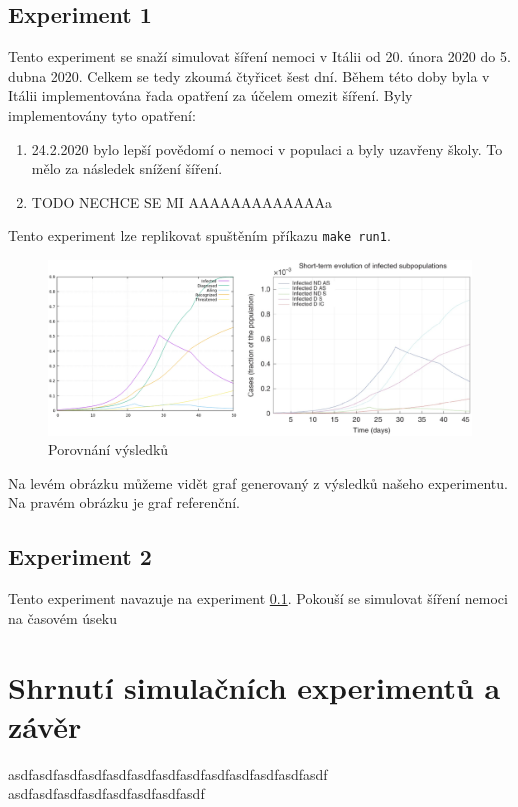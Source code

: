 \documentclass[a4paper,11pt]{article}
\begin{document}
		\subsection{Experiment 1}
		\label{e1}
			Tento experiment se snaží simulovat šíření nemoci v Itálii od 20. února 2020 do 5. dubna 2020. Celkem se tedy zkoumá čtyřicet šest dní. Během této doby byla v Itálii implementována řada opatření za účelem omezit šíření. Byly implementovány tyto opatření:
			\begin{enumerate}
				\item 24.2.2020 bylo lepší povědomí o nemoci v populaci a byly uzavřeny školy. To mělo za následek snížení šíření.
				\item TODO NECHCE SE MI AAAAAAAAAAAAAa
			\end{enumerate}
		
			Tento experiment lze replikovat spuštěním příkazu \texttt{make run1}.
			
			\begin{figure}[H]
				\caption{Porovnání výsledků}
				\label{fig2}
				\centering
				\includegraphics[scale=0.6]{comparison.png}
			\end{figure}
			
			Na levém obrázku můžeme vidět graf generovaný z výsledků našeho experimentu. Na pravém obrázku je graf referenční. 
			
		\subsection{Experiment 2}
			Tento experiment navazuje na experiment \ref{e1}. Pokouší se simulovat šíření nemoci na časovém úseku 
		
	\section{Shrnutí simulačních experimentů a závěr}
		asdfasdfasdfasdfasdfasdfasdfasdfasdfasdfasdfasdfasdf
		asdfasdfasdfasdfasdfasdfasdfasdf

	\newpage
	
	\renewcommand{\refname}{Literatura}
	
\end{document}
